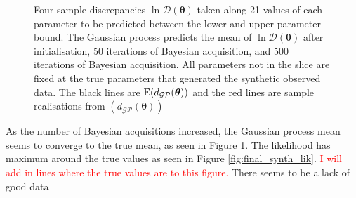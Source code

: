 \begin{figure}[htbp]
\begin{subfigure}[b]{0.33\textwidth}
    \end{subfigure}
    \caption{
        Four sample discrepancies $\ln\mathcal{D}(\bm{\theta})$ taken along 21 
        values of each parameter to be predicted between the lower and upper 
        parameter bound.
        The Gaussian process predicts the mean of $\ln\mathcal{D}(\bm{\theta})$ 
        after initialisation, 
        50 iterations of Bayesian acquisition, and
        500 iterations of Bayesian acquisition.
        All parameters not in the slice are fixed at the true parameters that
        generated the synthetic observed data. The black lines are 
        $\operatorname{E}(d_\mathcal{GP}(\bm{\theta}))$ and the red lines are sample realisations
        from $(d_\mathcal{GP}(\bm{\theta}))$
    }
    \label{fig:improving_GP}
\end{figure}

As the number of Bayesian acquisitions increased, the Gaussian process mean 
seems to converge to the true mean, as seen in Figure \ref{fig:improving_GP}. 
The likelihood has maximum around the true values as seen in Figure
\ref{fig:final_synth_lik}. 
\textcolor{red}{I will add in lines where the true values are to this figure.}
There seems to be a lack of good data

